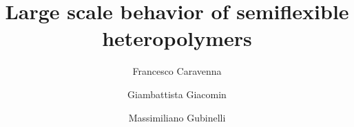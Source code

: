 \documentclass[a4paper,reqno,11pt]{amsart}
\numberwithin{equation}{section}
\begin{document}
\title[Disordered semiflexible polymers]{Large scale behavior of semiflexible heteropolymers}

\author{Francesco Caravenna}

\address{Dipartimento di Matematica Pura e Applicata, Universit\`a
degli Studi di Padova,
via \mbox{Trieste} 63, 35121 Padova, Italy}


\author{Giambattista Giacomin}
\address{
Universit\'e Paris  Diderot (Paris 7) and Laboratoire de Probabilit{\'e}s et Mod\`eles Al\'eatoires (CNRS U.M.R. 7599),
                             UFR de Math\'ematiques,
                             case 7012 (site Chevaleret)
                             75205 PARIS Cedex 13, France
}


\author{Massimiliano Gubinelli}
\address{Equipe de probabilit\'es, statistique et mod\'elisation, Universit\'e de Paris-Sud, B\^atiment 425, 91405 ORSAY Cedex, France
-- now at CEREMADE, Universit\'e Paris Dauphine, France}



\end{document}
